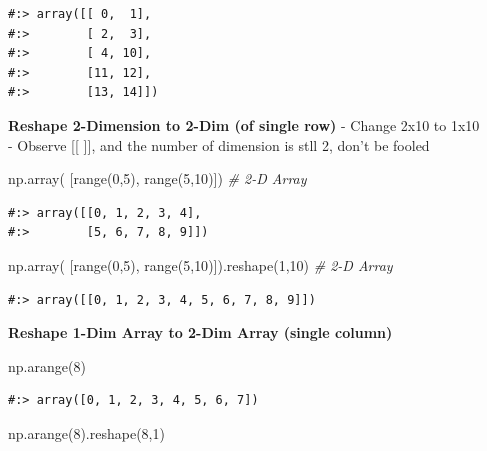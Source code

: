 \documentclass[
]{book}
\newenvironment{Shaded}{\begin{snugshade}}{\end{snugshade}}
\newcommand{\BuiltInTok}[1]{#1}
\newcommand{\CommentTok}[1]{\textcolor[rgb]{0.37,0.37,0.37}{\textit{#1}}}
\newcommand{\DecValTok}[1]{\textcolor[rgb]{0.06,0.06,0.06}{#1}}
\newcommand{\NormalTok}[1]{#1}
\begin{document}
\begin{verbatim}
#:> array([[ 0,  1],
#:>        [ 2,  3],
#:>        [ 4, 10],
#:>        [11, 12],
#:>        [13, 14]])
\end{verbatim}

\textbf{Reshape 2-Dimension to 2-Dim (of single row)} - Change 2x10 to 1x10\\
- Observe {[}{[} {]}{]}, and the number of dimension is stll 2, don't be fooled

\begin{Shaded}
\begin{Highlighting}[]
\NormalTok{np.array( [}\BuiltInTok{range}\NormalTok{(}\DecValTok{0}\NormalTok{,}\DecValTok{5}\NormalTok{), }\BuiltInTok{range}\NormalTok{(}\DecValTok{5}\NormalTok{,}\DecValTok{10}\NormalTok{)])  }\CommentTok{# 2-D Array}
\end{Highlighting}
\end{Shaded}

\begin{verbatim}
#:> array([[0, 1, 2, 3, 4],
#:>        [5, 6, 7, 8, 9]])
\end{verbatim}

\begin{Shaded}
\begin{Highlighting}[]
\NormalTok{np.array( [}\BuiltInTok{range}\NormalTok{(}\DecValTok{0}\NormalTok{,}\DecValTok{5}\NormalTok{), }\BuiltInTok{range}\NormalTok{(}\DecValTok{5}\NormalTok{,}\DecValTok{10}\NormalTok{)]).reshape(}\DecValTok{1}\NormalTok{,}\DecValTok{10}\NormalTok{) }\CommentTok{# 2-D Array}
\end{Highlighting}
\end{Shaded}

\begin{verbatim}
#:> array([[0, 1, 2, 3, 4, 5, 6, 7, 8, 9]])
\end{verbatim}

\textbf{Reshape 1-Dim Array to 2-Dim Array (single column)}

\begin{Shaded}
\begin{Highlighting}[]
\NormalTok{np.arange(}\DecValTok{8}\NormalTok{)}
\end{Highlighting}
\end{Shaded}

\begin{verbatim}
#:> array([0, 1, 2, 3, 4, 5, 6, 7])
\end{verbatim}

\begin{Shaded}
\begin{Highlighting}[]
\NormalTok{np.arange(}\DecValTok{8}\NormalTok{).reshape(}\DecValTok{8}\NormalTok{,}\DecValTok{1}\NormalTok{)}
\end{Highlighting}
\end{Shaded}
\end{document}
